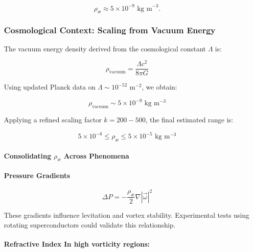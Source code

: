 \begin{equation*}
    \rho_\text{\ae} \approx 5 \times 10^{-9} \text{ kg m}^{-3}.
\end{equation*}

\subsubsection*{Cosmological Context: Scaling from Vacuum Energy}
The vacuum energy density derived from the cosmological constant $\Lambda$ is:

\begin{equation*}
\rho_\text{vacuum} = \frac{\Lambda c^2}{8 \pi G}
\end{equation*}

Using updated Planck data on $\Lambda \sim 10^{-52} \text{ m}^{-2}$, we obtain:

\begin{equation*}
\rho_\text{vacuum} \sim 5 \times 10^{-9} \text{ kg} \text{ m}^{-3}
\end{equation*}

Applying a refined scaling factor $k = 200 - 500$, the final estimated range is:

\begin{equation*}
5 \times 10^{-8} \leq \rho_\text{\ae} \leq 5 \times 10^{-5} \text{ kg} \text{ m}^{-3}
\end{equation*}

\paragraph{Consolidating $\rho_\text{\ae}$ Across Phenomena}

\paragraph{Pressure Gradients}

\begin{equation*}
\Delta P = -\frac{\rho_\text{\ae}}{2} \nabla |\vec{\omega}|^2
\end{equation*}

These gradients influence levitation and vortex stability. Experimental tests using rotating superconductors could validate this relationship.

\paragraph{Refractive Index In high vorticity regions:}

